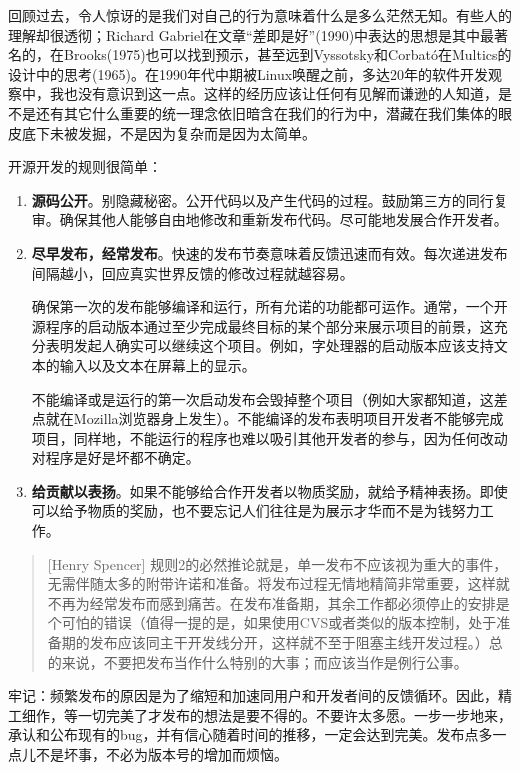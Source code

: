 \documentclass[12pt,oneside]{book}
\begin{document}
回顾过去，令人惊讶的是我们对自己的行为意味着什么是多么茫然无知。有些人的理解却很透彻；Richard Gabriel在文章“差即是好”\cite{Gabriel}(1990)中表达的思想是其中最著名的，在Brooks\cite{Brooks}(1975\linebreak )也可以找到预示，甚至远到Vyssotsky和Corbató在Multics的设计中的思考(1965)。在1990年代中期被Linux唤醒之前，多达20年的软件开发观察中，我也没有意识到这一点。这样的经历应该让任何有见解而谦逊的人知道，是不是还有其它什么重要的统一理念依旧暗含在我们的行为中，潜藏在我们集体的眼皮底下未被发掘，不是因为复杂而是因为太简单。

开源开发的规则很简单：
\begin{enumerate}
\item \textbf{源码公开}。别隐藏秘密。公开代码以及产生代码的过程。鼓励第三方的同行复审。确保其他人能够自由地修改和重新发布代码。尽可能地发展合作开发者。
\item \textbf{尽早发布，经常发布}。快速的发布节奏意味着反馈迅速而有效。每次递进发布间隔越小，回应真实世界反馈的修改过程就越容易。

确保第一次的发布能够编译和运行，所有允诺的功能都可运作。通常，一个开源程序的启动版本通过至少完成最终目标的某个部分来展示项目的前景，这充分表明发起人确实可以继续这个项目。例如，字处理器的启动版本应该支持文本的输入以及文本在屏幕上的显示。

不能编译或是运行的第一次启动发布会毁掉整个项目（例如大家都知道，这差点就在Mozilla浏览器身上发生）。不能编译的发布表明项目开发者不能够完成项目，同样地，不能运行的程序也难以吸引其他开发者的参与，因为任何改动对程序是好是坏都不确定。

\item \textbf{给贡献以表扬}。如果不能够给合作开发者以物质奖励，就给予精神表扬。即使可以给予物质的奖励，也不要忘记人们往往是为展示才华而不是为钱努力工作。
\end{enumerate}

\begin{quote}[Henry Spencer]
规则2的必然推论就是，单一发布不应该视为重大的事件，无需伴随太多的附带许诺和准备。将发布过程无情地精简非常重要，这样就不再为经常发布而感到痛苦。在发布准备期，其余工作都必须停止的安排是个可怕的错误（值得一提的是，如果使用CVS或者类似的版本控制，处于准备期的发布应该同主干开发线分开，这样就不至于阻塞主线开发过程。）总的来说，不要把发布当作什么特别的大事；而应该当作是例行公事。
\end{quote}

牢记：频繁发布的原因是为了缩短和加速同用户和开发者间的反馈循环。因此，精工细作，等一切完美了才发布的想法是要不得的。不要许太多愿。一步一步地来，承认和公布现有的bug，并有信心随着时间的推移，一定会达到完美。发布点多一点儿不是坏事，不必为版本号的增加而烦恼。
\end{document}
